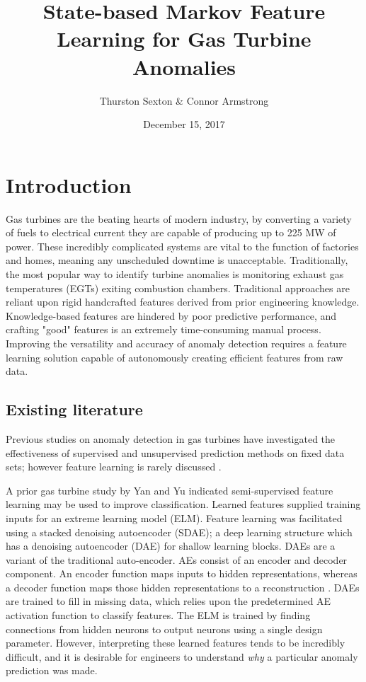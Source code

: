 \documentclass[twocolumn,10pt]{article}
\title{State-based Markov Feature Learning for Gas Turbine Anomalies}
\author{Thurston Sexton \& Connor Armstrong}
\date{December 15, 2017}
\begin{document}
\maketitle

\section{Introduction}

Gas turbines are the beating hearts of modern industry, by converting a variety of fuels to electrical current they are capable of producing up to 225 MW of power. These incredibly complicated systems are vital to the function of factories and homes, meaning any unscheduled downtime is unacceptable. Traditionally, the most popular way to identify turbine anomalies is monitoring exhaust gas temperatures (EGTs) exiting combustion chambers. Traditional approaches are reliant upon rigid handcrafted features derived from prior engineering knowledge. Knowledge-based features are hindered by poor predictive performance, and crafting "good" features is an extremely time-consuming manual process. Improving the versatility and accuracy of anomaly detection requires a feature learning solution capable of autonomously creating efficient features from raw data. 

\subsection{Existing literature}

Previous studies on anomaly detection in gas turbines have investigated the effectiveness of supervised and unsupervised prediction methods on fixed data sets; however feature learning is rarely discussed \cite{yan2015}. 

A prior gas turbine study by Yan and Yu \cite{yan2015} indicated semi-supervised feature learning may be used to improve classification. Learned features supplied training inputs for an extreme learning model (ELM). Feature learning was facilitated using a stacked denoising autoencoder (SDAE); a deep learning structure which has a denoising autoencoder (DAE) for shallow learning blocks. DAEs are a variant of the traditional auto-encoder. AEs consist of an encoder and decoder component. An encoder function maps inputs to hidden representations, whereas a decoder function maps those hidden representations to a reconstruction \cite{yan2015}. DAEs are trained to fill in missing data, which relies upon the predetermined AE activation function to classify features. The ELM is trained by finding connections from hidden neurons to output neurons using a single design parameter. However, interpreting these learned features tends to be incredibly difficult, and it is desirable for engineers to understand \textit{why} a particular anomaly prediction was made.
\end{document}
